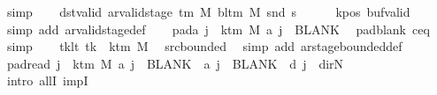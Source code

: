 \begin{isabellebody}
\ simp\isanewline
\ \ \isamarkupfalse%
\ dst{\isacharunderscore}{\kern0pt}valid{\isacharcolon}{\kern0pt}\ {\isachardoublequoteopen}ar{\isacharunderscore}{\kern0pt}valid{\isacharunderscore}{\kern0pt}stage\ {\isacharparenleft}{\kern0pt}{\isasymGamma}{\isacharunderscore}{\kern0pt}tm\ M{\isacharparenright}{\kern0pt}\ {\isacharparenleft}{\kern0pt}bl{\isacharunderscore}{\kern0pt}tm\ M{\isacharparenright}{\kern0pt}\ {\isacharparenleft}{\kern0pt}snd\ {\isacharquery}{\kern0pt}s{\isacharprime}{\kern0pt}{\isacharparenright}{\kern0pt}{\isachardoublequoteclose}\isanewline
\ \ \ \ \isamarkupfalse%
\ kpos\ buf{\isacharunderscore}{\kern0pt}valid\ \isamarkupfalse%
\ {\isacharparenleft}{\kern0pt}simp\ add{\isacharcolon}{\kern0pt}\ ar{\isacharunderscore}{\kern0pt}valid{\isacharunderscore}{\kern0pt}stage{\isacharunderscore}{\kern0pt}def{\isacharparenright}{\kern0pt}\isanewline
\ \ \isamarkupfalse%
\ pad{\isacharunderscore}{\kern0pt}a{\isacharcolon}{\kern0pt}\ {\isachardoublequoteopen}{\isasymforall}j\ {\isasymge}\ k{\isacharunderscore}{\kern0pt}tm\ M{\isachardot}{\kern0pt}\ {\isacharquery}{\kern0pt}a\ j\ {\isacharequal}{\kern0pt}\ BLANK{}{\isachardoublequoteclose}\ \isamarkupfalse%
\ pad{\isacharunderscore}{\kern0pt}blank\ c{\isacharprime}{\kern0pt}{\isacharunderscore}{\kern0pt}eq\ \isamarkupfalse%
\ simp\isanewline
\ \ \isamarkupfalse%
\ tk{\isacharunderscore}{\kern0pt}lt{\isacharcolon}{\kern0pt}\ {\isachardoublequoteopen}tk\ {\isacharless}{\kern0pt}\ k{\isacharunderscore}{\kern0pt}tm\ M{\isachardoublequoteclose}\ \isamarkupfalse%
\ src{\isacharunderscore}{\kern0pt}bounded\ \isamarkupfalse%
\ {\isacharparenleft}{\kern0pt}simp\ add{\isacharcolon}{\kern0pt}\ ar{\isacharunderscore}{\kern0pt}stage{\isacharunderscore}{\kern0pt}bounded{\isacharunderscore}{\kern0pt}def{\isacharparenright}{\kern0pt}\isanewline
\ \ \isamarkupfalse%
\ pad{\isacharunderscore}{\kern0pt}read{\isacharcolon}{\kern0pt}\ {\isachardoublequoteopen}{\isasymforall}j\ {\isasymge}\ k{\isacharunderscore}{\kern0pt}tm\ M{\isachardot}{\kern0pt}\ {\isacharquery}{\kern0pt}a\ j\ {\isacharequal}{\kern0pt}\ BLANK{}\ {\isasymand}\ {\isacharquery}{\kern0pt}a\ j\ {\isacharequal}{\kern0pt}\ BLANK{}\ {\isasymand}\ {\isacharquery}{\kern0pt}d\ j\ {\isacharequal}{\kern0pt}\ dir{\isachardot}{\kern0pt}N{\isachardoublequoteclose}\isanewline
\ \ \isamarkupfalse%
\ {\isacharparenleft}{\kern0pt}intro\ allI\ impI{\isacharparenright}{\kern0pt}\isanewline

\end{isabellebody}
